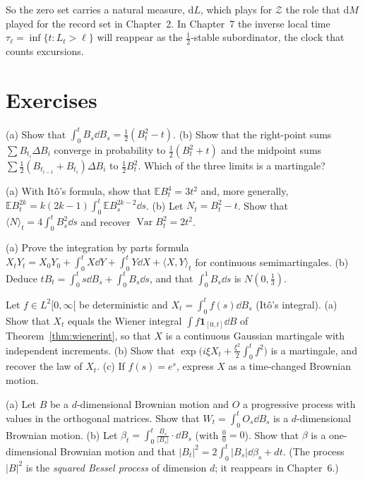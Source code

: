 So the zero set carries a natural measure, $\mathrm dL$, which plays for $\mathcal Z$ the role that $\mathrm dM$ played for the record set in Chapter~2.
In Chapter~7 the inverse local time $\tau_\ell=\inf\{t:L_t>\ell\}$ will reappear as the $\frac12$-stable subordinator, the clock that counts excursions.

\section{Exercises}

\begin{exercise}[$\star$]\label{ex:bdb}
(a) Show that $\int_0^tB_s\dd B_s=\frac12(B_t^2-t)$. (b) Show that the right-point sums $\sum B_{t_i}\Delta B_i$ converge in probability to $\frac12(B_t^2+t)$ and the midpoint sums $\sum\frac12(B_{t_{i-1}}+B_{t_i})\Delta B_i$ to
$\frac12B_t^2$. Which of the three limits is a martingale?
\end{exercise}

\begin{exercise}[$\star$]\label{ex:moments}
(a) With It\^o's formula, show that $\mathbb EB_t^4=3t^2$ and, more generally, $\mathbb EB_t^{2k}=k(2k-1)\int_0^t\mathbb EB_s^{2k-2}\dd s$. (b) Let $N_t=B_t^2-t$. Show that $\langle N\rangle_t=4\int_0^tB_s^2\dd s$ and recover $\operatorname{Var}B_t^2=2t^2$.
\end{exercise}

\begin{exercise}[$\star$]\label{ex:ibp}
(a) Prove the integration by parts formula $X_tY_t=X_0Y_0+\int_0^tX\dd Y+\int_0^tY\dd X+\langle X,Y\rangle_t$ for continuous semimartingales. (b) Deduce $tB_t=\int_0^ts\dd B_s+\int_0^tB_s\dd s$, and that
$\int_0^1B_s\dd s$ is $N(0,\frac13)$.
\end{exercise}

\begin{exercise}[$\star\star$]\label{ex:wienerito}
Let $f\in L^2[0,\infty[$ be deterministic and $X_t=\int_0^tf(s)\dd B_s$ (It\^o's integral). (a) Show that $X_t$ equals the Wiener integral $\int f\mathbf 1_{[0,t]}\dd B$ of Theorem~\ref{thm:wienerint}, so that $X$ is a continuous
Gaussian martingale with independent increments. (b) Show that $\exp\bigl(i\xi X_t+\frac{\xi^2}2\int_0^tf^2\bigr)$ is a martingale, and recover the law of $X_t$. (c) If $f(s)=e^{s}$, express $X$ as a time-changed Brownian motion.
\end{exercise}

\begin{exercise}[$\star\star$]\label{ex:rotation}
(a) Let $B$ be a $d$-dimensional Brownian motion and $O$ a progressive process with values in the orthogonal matrices. Show that $W_t=\int_0^tO_s\dd B_s$ is a $d$-dimensional Brownian motion. (b) Let
$\beta_t=\int_0^t\frac{B_s}{|B_s|}\cdot\dd B_s$ (with $\frac00=0$). Show that $\beta$ is a one-dimensional Brownian motion and that $|B_t|^2=2\int_0^t|B_s|\dd\beta_s+dt$. (The process $|B|^2$ is the
\emph{squared Bessel process} of dimension $d$; it reappears in Chapter~6.)
\end{exercise}

